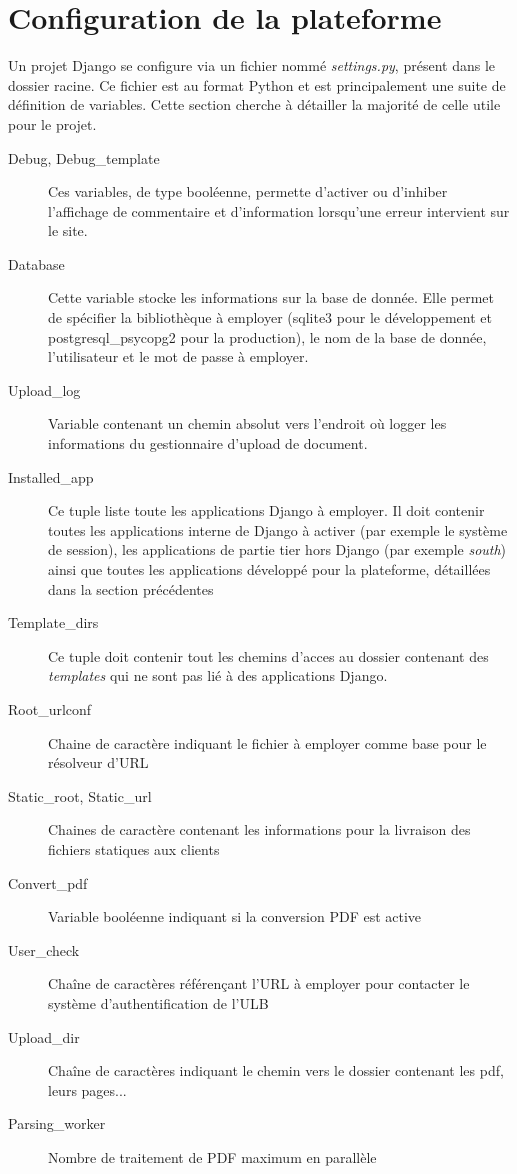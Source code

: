 \documentclass[a4paper,12pt]{article}
\begin{document}
\section{Configuration de la plateforme}

Un projet Django se configure via un fichier nommé \textit{settings.py},
présent dans le dossier racine. Ce fichier est au format Python et est principalement
une suite de définition de variables. Cette section cherche à détailler la majorité
de celle utile pour le projet.

\begin{description}
\item[Debug, Debug\_template] Ces variables, de type booléenne, permette d'activer
      ou d'inhiber l'affichage de commentaire et d'information lorsqu'une erreur
      intervient sur le site.
\item[Database] Cette variable stocke les informations sur la base de donnée. Elle
      permet de spécifier la bibliothèque à employer (sqlite3 pour le développement
      et postgresql\_psycopg2 pour la production), le nom de la base de donnée, l'utilisateur
      et le mot de passe à employer.
\item[Upload\_log] Variable contenant un chemin absolut vers l'endroit où logger
      les informations du gestionnaire d'upload de document.
\item[Installed\_app] Ce tuple liste toute les applications Django à employer. Il
      doit contenir toutes les applications interne de Django à activer (par exemple
      le système de session), les applications de partie tier hors Django (par exemple
      \textit{south}) ainsi que toutes les applications développé pour la plateforme,
      détaillées dans la section précédentes
\item[Template\_dirs] Ce tuple doit contenir tout les chemins d'acces au dossier
      contenant des \textit{templates} qui ne sont pas lié à des applications Django.
\item[Root\_urlconf] Chaine de caractère indiquant le fichier à employer comme
      base pour le résolveur d'URL
\item[Static\_root, Static\_url] Chaines de caractère contenant les informations
      pour la livraison des fichiers statiques aux clients
\item[Convert\_pdf] Variable booléenne indiquant si la conversion PDF est active
\item[User\_check] Chaîne de caractères référençant l'URL à employer pour contacter
      le système d'authentification de l'ULB
\item[Upload\_dir] Chaîne de caractères indiquant le chemin vers le dossier contenant
      les pdf, leurs pages...
\item[Parsing\_worker] Nombre de traitement de PDF maximum en parallèle
\end{description}
\end{document}
